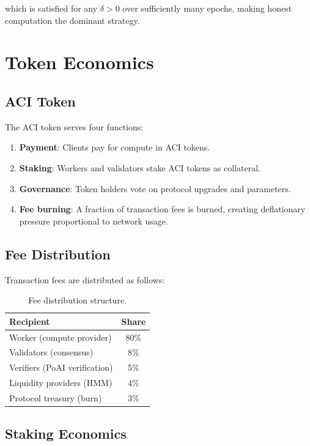 \documentclass[11pt,twocolumn]{article}
\begin{document}
which is satisfied for any $\delta > 0$ over sufficiently many epochs, making honest computation the dominant strategy.

\section{Token Economics}
\label{sec:tokenomics}

\subsection{ACI Token}

The ACI token serves four functions:

\begin{enumerate}[leftmargin=1.4em]
    \item \textbf{Payment}: Clients pay for compute in ACI tokens.
    \item \textbf{Staking}: Workers and validators stake ACI tokens as collateral.
    \item \textbf{Governance}: Token holders vote on protocol upgrades and parameters.
    \item \textbf{Fee burning}: A fraction of transaction fees is burned, creating deflationary pressure proportional to network usage.
\end{enumerate}

\subsection{Fee Distribution}

Transaction fees are distributed as follows:

\begin{table}[H]
\centering
\begin{tabular}{lc}
\toprule
\textbf{Recipient} & \textbf{Share} \\
\midrule
Worker (compute provider) & 80\% \\
Validators (consensus) & 8\% \\
Verifiers (PoAI verification) & 5\% \\
Liquidity providers (HMM) & 4\% \\
Protocol treasury (burn) & 3\% \\
\bottomrule
\end{tabular}
\caption{Fee distribution structure.}
\label{tab:fees}
\end{table}

\subsection{Staking Economics}
\end{document}
